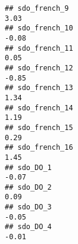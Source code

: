 \documentclass[
]{article}
\begin{document}
\begin{verbatim}
## sdo_french_9                                                                                                                                                                                                                 3.03
## sdo_french_10                                                                                                                                                                                                               -0.08
## sdo_french_11                                                                                                                                                                                                                0.05
## sdo_french_12                                                                                                                                                                                                               -0.85
## sdo_french_13                                                                                                                                                                                                                1.34
## sdo_french_14                                                                                                                                                                                                                1.19
## sdo_french_15                                                                                                                                                                                                                0.29
## sdo_french_16                                                                                                                                                                                                                1.45
## sdo_DO_1                                                                                                                                                                                                                    -0.07
## sdo_DO_2                                                                                                                                                                                                                     0.09
## sdo_DO_3                                                                                                                                                                                                                    -0.05
## sdo_DO_4                                                                                                                                                                                                                    -0.01

\end{verbatim}
\end{document}
